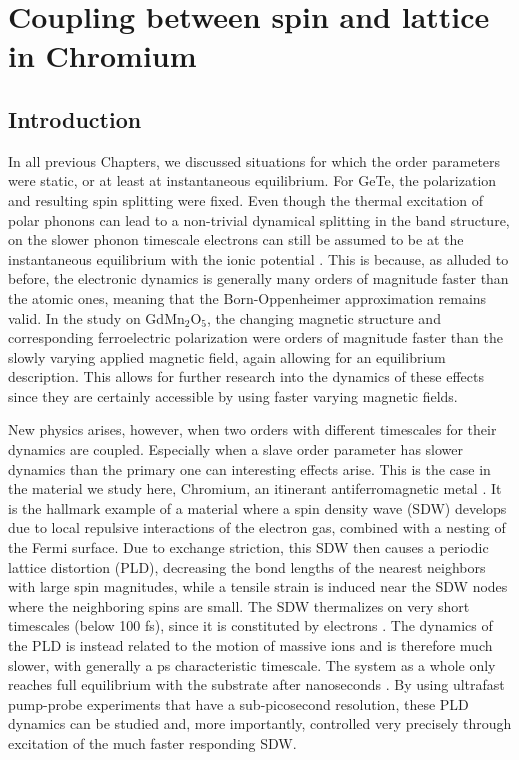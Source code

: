 \chapter{Coupling between spin and lattice in Chromium \label{ch:CrSDW}}
\section{Introduction}
In all previous Chapters, we discussed situations for which the order parameters were static, or at least at instantaneous equilibrium.
For GeTe, the polarization and resulting spin splitting were fixed.
Even though the thermal excitation of polar phonons can lead to a non-trivial dynamical splitting in the band structure, on the slower phonon timescale electrons can still be assumed to be at the instantaneous equilibrium with the ionic potential \cite{Monserrat2017}.
This is because, as alluded to before, the electronic dynamics is generally many orders of magnitude faster than the atomic ones, meaning that the Born-Oppenheimer approximation remains valid.
In the study on GdMn$_2$O$_5$, the changing magnetic structure and corresponding ferroelectric polarization were orders of magnitude faster than the slowly varying applied magnetic field, again allowing for an equilibrium description.
This allows for further research into the dynamics of these effects since they are certainly accessible by using faster varying magnetic fields.

New physics arises, however, when two orders with different timescales for their dynamics are coupled.
Especially when a slave order parameter has slower dynamics than the primary one can interesting effects arise.
This is the case in the material we study here, Chromium, an itinerant antiferromagnetic metal \cite{Kulikov1984,Fawcett1988}.
It is the hallmark example of a material where a spin density wave (SDW) develops due to local repulsive interactions of the electron gas, combined with a nesting of the Fermi surface.
Due to exchange striction, this SDW then causes a periodic lattice distortion (PLD), decreasing the bond lengths of the nearest neighbors with large spin magnitudes, while a tensile strain is induced near the SDW nodes where the neighboring spins are small. 
The SDW thermalizes on very short timescales (below 100 fs), since it is constituted by electrons \cite{Nicholson2016}.
The dynamics of the PLD is instead related to the motion of massive ions and is therefore much slower, with generally a ps characteristic timescale.
The system as a whole only reaches full equilibrium with the substrate after nanoseconds \cite{Singer2015prb}. 
By using ultrafast pump-probe experiments that have a sub-picosecond resolution, these PLD dynamics can be studied and, more importantly, controlled very precisely through excitation of the much faster responding SDW.

